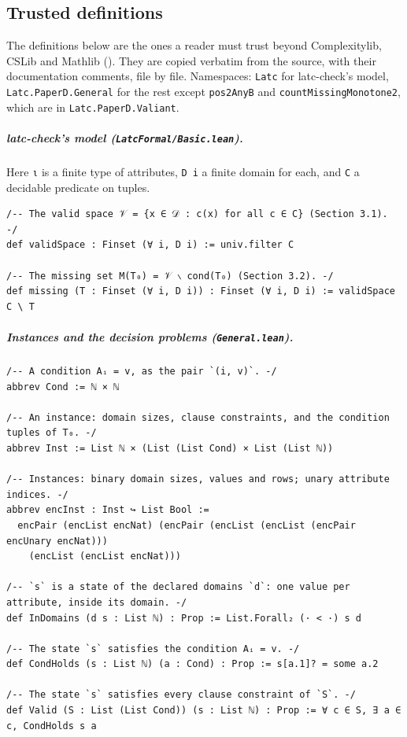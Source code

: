 \documentclass[pdflatex,sn-mathphys-num]{sn-jnl}
\theoremstyle{thmstyleone}
\theoremstyle{thmstylethree}
\begin{document}
\begin{appendices}
\section{Trusted definitions}
\label{app:definitions}

The definitions below are the ones a reader must trust beyond Complexitylib, CSLib and Mathlib
(). They are copied verbatim from the source, with their documentation
comments, file by file. Namespaces: \lstinline{Latc} for latc-check's model,
\lstinline{Latc.PaperD.General} for the rest except \lstinline{pos2AnyB} and
\lstinline{countMissingMonotone2}, which are in \lstinline{Latc.PaperD.Valiant}.

\subparagraph*{latc-check's model (\texttt{LatcFormal/Basic.lean}).}
Here \lstinline{ι} is a finite type of attributes, \lstinline{D i} a finite domain for each, and
\lstinline{C} a decidable predicate on tuples.
\begin{lstlisting}
/-- The valid space 𝒱 = {x ∈ 𝒟 : c(x) for all c ∈ C} (Section 3.1). -/
def validSpace : Finset (∀ i, D i) := univ.filter C

/-- The missing set M(T₀) = 𝒱 ∖ cond(T₀) (Section 3.2). -/
def missing (T : Finset (∀ i, D i)) : Finset (∀ i, D i) := validSpace C \ T
\end{lstlisting}

\subparagraph*{Instances and the decision problems (\texttt{General.lean}).}
\begin{lstlisting}
/-- A condition Aᵢ = v, as the pair `(i, v)`. -/
abbrev Cond := ℕ × ℕ

/-- An instance: domain sizes, clause constraints, and the condition tuples of T₀. -/
abbrev Inst := List ℕ × (List (List Cond) × List (List ℕ))

/-- Instances: binary domain sizes, values and rows; unary attribute indices. -/
abbrev encInst : Inst ↪ List Bool :=
  encPair (encList encNat) (encPair (encList (encList (encPair encUnary encNat)))
    (encList (encList encNat)))

/-- `s` is a state of the declared domains `d`: one value per attribute, inside its domain. -/
def InDomains (d s : List ℕ) : Prop := List.Forall₂ (· < ·) s d

/-- The state `s` satisfies the condition Aᵢ = v. -/
def CondHolds (s : List ℕ) (a : Cond) : Prop := s[a.1]? = some a.2

/-- The state `s` satisfies every clause constraint of `S`. -/
def Valid (S : List (List Cond)) (s : List ℕ) : Prop := ∀ c ∈ S, ∃ a ∈ c, CondHolds s a


\end{lstlisting}
\end{appendices}
\end{document}
